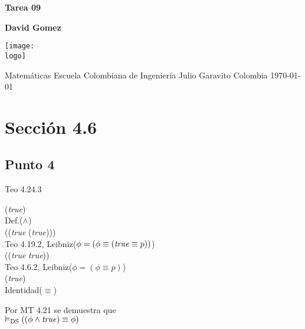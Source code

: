 \documentclass{article}
\newcommand{\logo}{C:/Users/usuario/Documents/U/logo-eci.jpg}
\newcommand{\titlename}{Tarea 09}%
\renewcommand{\author}{David Gomez}%
\begin{document}
\begin{titlepage}
    \begin{center}
        \vspace*{1cm}

        \textbf{\Huge{\titlename}}

        \vspace{1.5cm}

        \textbf{\large{\author}
}
        \vspace{4cm}

        \texttt{[image: \\logo]}

        \vspace{4cm}

        Matemáticas\linebreak
        Escuela Colombiana de Ingeniería Julio Garavito\linebreak
        Colombia\linebreak
        \today

    \end{center}
\end{titlepage}
\clearpage
\tableofcontents
\clearpage

\section{Sección 4.6}
\subsection{Punto 4}
\begin{logicenv}{Teo 4.24.3}
    \begin{derivation}
            (\phi \land \textrm{\textit{true}})\\
        Def.($\land$)\\
            (\phi \equiv (\textrm{\textit{true}} \equiv (\phi \lor \textrm{\textit{true}})))\\
        Teo 4.19.2, Leibniz($\phi = (\phi \equiv (\textrm{\textit{true}} \equiv p))$)\\
            (\phi \equiv (\textrm{\textit{true}} \equiv \textrm{\textit{true}}))\\
        Teo 4.6.2, Leibniz($\phi = (\phi \equiv p)$)\\
            (\phi \equiv \textrm{\textit{true}})\\
        Identidad($\equiv$)\\
            \phi
    \end{derivation}
    Por MT 4.21 se demuestra que\\
    $\vDash_{\text{DS}} ((\phi \land \textrm{\textit{true}}) \equiv \phi)$
\end{logicenv}
\end{document}
